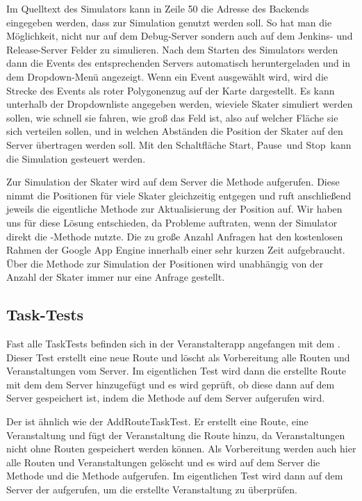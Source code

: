 Im Quelltext des Simulators kann in Zeile 50 die Adresse des Backends eingegeben werden, dass zur Simulation genutzt werden soll. So hat man die Möglichkeit, nicht nur auf dem Debug-Server sondern auch auf dem Jenkins- und Release-Server Felder zu simulieren. Nach dem Starten des Simulators werden dann die Events des entsprechenden Servers automatisch heruntergeladen und in dem Dropdown-Menü angezeigt. Wenn ein Event ausgewählt wird, wird die Strecke des Events als roter Polygonenzug auf der Karte dargestellt. Es kann unterhalb der Dropdownliste angegeben werden, wieviele Skater simuliert werden sollen, wie schnell sie fahren, wie groß das Feld ist, also auf welcher Fläche sie sich verteilen sollen, und in welchen Abständen die Position der Skater auf den Server übertragen werden soll. Mit den Schaltfläche \glqq Start\grqq, \glqq Pause\grqq\ und \glqq Stop\grqq\ kann die Simulation gesteuert werden.

Zur Simulation der Skater wird auf dem Server die Methode  aufgerufen. Diese nimmt die Positionen für viele Skater gleichzeitig entgegen und ruft anschließend jeweils die eigentliche Methode zur Aktualisierung der Position  auf. Wir haben uns für diese Lösung entschieden, da Probleme auftraten, wenn der Simulator direkt die -Methode nutzte. Die zu große Anzahl Anfragen hat den kostenlosen Rahmen der Google App Engine innerhalb einer sehr kurzen Zeit aufgebraucht. Über die Methode zur Simulation der Positionen wird unabhängig von der Anzahl der Skater immer nur eine Anfrage gestellt.

\subsection{Task-Tests}
Fast alle TaskTests befinden sich in der Veranstalterapp angefangen mit dem . Dieser Test erstellt eine neue Route und löscht als Vorbereitung alle Routen und Veranstaltungen vom Server. Im eigentlichen Test wird dann die erstellte Route mit dem  dem Server hinzugefügt und es wird geprüft, ob diese dann auf dem Server gespeichert ist, indem die  Methode auf dem Server aufgerufen wird.

Der  ist ähnlich wie der AddRouteTaskTest. Er erstellt eine Route, eine Veranstaltung und fügt der Veranstaltung die Route hinzu, da Veranstaltungen nicht ohne Routen gespeichert werden können. Als Vorbereitung werden auch hier alle Routen und Veranstaltungen gelöscht und es wird auf dem Server die   Methode und die  Methode aufgerufen. Im eigentlichen Test wird dann auf dem Server der  aufgerufen, um die erstellte Veranstaltung zu überprüfen. 

